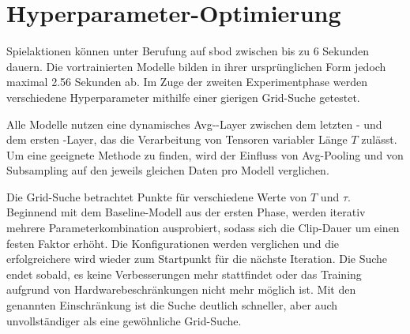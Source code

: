 \section{Hyperparameter-Optimierung}
\label{sec:hyperparameter-optimierung}

Spielaktionen können unter Berufung auf \gls{sbod} zwischen bis zu 6 Sekunden dauern.
Die vortrainierten Modelle bilden in ihrer ursprünglichen Form jedoch maximal 2.56 Sekunden ab.
Im Zuge der zweiten Experimentphase werden verschiedene Hyperparameter mithilfe einer gierigen Grid-Suche getestet.

Alle Modelle nutzen eine dynamisches Avg-\pool-Layer zwischen dem letzten \conv- und dem ersten \fc-Layer, das die Verarbeitung von Tensoren variabler Länge $T$ zulässt.
Um eine geeignete Methode zu finden, wird der Einfluss von Avg-Pooling und von Subsampling auf den jeweils gleichen Daten pro Modell verglichen.

Die Grid-Suche betrachtet Punkte für verschiedene Werte von $T$ und $\tau$.
Beginnend mit dem Baseline-Modell aus der ersten Phase, werden iterativ mehrere Parameterkombination ausprobiert, sodass sich die Clip-Dauer um einen festen Faktor erhöht.
Die Konfigurationen werden verglichen und die erfolgreichere wird wieder zum Startpunkt für die nächste Iteration.
Die Suche endet sobald, es keine Verbesserungen mehr stattfindet oder das Training aufgrund von Hardwarebeschränkungen nicht mehr möglich ist.
Mit den genannten Einschränkung ist die Suche deutlich schneller, aber auch unvollständiger als eine gewöhnliche Grid-Suche.

